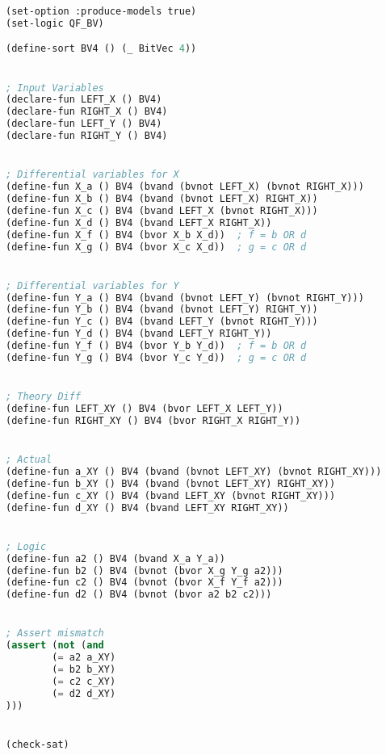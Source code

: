 \begin{lstlisting}[language=lisp, caption={OR logic proof}, label=lst:or-proof]
(set-option :produce-models true)
(set-logic QF_BV)

(define-sort BV4 () (_ BitVec 4))


; Input Variables
(declare-fun LEFT_X () BV4)
(declare-fun RIGHT_X () BV4)
(declare-fun LEFT_Y () BV4)
(declare-fun RIGHT_Y () BV4)


; Differential variables for X
(define-fun X_a () BV4 (bvand (bvnot LEFT_X) (bvnot RIGHT_X)))
(define-fun X_b () BV4 (bvand (bvnot LEFT_X) RIGHT_X))
(define-fun X_c () BV4 (bvand LEFT_X (bvnot RIGHT_X)))
(define-fun X_d () BV4 (bvand LEFT_X RIGHT_X))
(define-fun X_f () BV4 (bvor X_b X_d))  ; f = b OR d
(define-fun X_g () BV4 (bvor X_c X_d))  ; g = c OR d


; Differential variables for Y
(define-fun Y_a () BV4 (bvand (bvnot LEFT_Y) (bvnot RIGHT_Y)))
(define-fun Y_b () BV4 (bvand (bvnot LEFT_Y) RIGHT_Y))
(define-fun Y_c () BV4 (bvand LEFT_Y (bvnot RIGHT_Y)))
(define-fun Y_d () BV4 (bvand LEFT_Y RIGHT_Y))
(define-fun Y_f () BV4 (bvor Y_b Y_d))  ; f = b OR d
(define-fun Y_g () BV4 (bvor Y_c Y_d))  ; g = c OR d


; Theory Diff
(define-fun LEFT_XY () BV4 (bvor LEFT_X LEFT_Y))
(define-fun RIGHT_XY () BV4 (bvor RIGHT_X RIGHT_Y))


; Actual
(define-fun a_XY () BV4 (bvand (bvnot LEFT_XY) (bvnot RIGHT_XY)))
(define-fun b_XY () BV4 (bvand (bvnot LEFT_XY) RIGHT_XY))
(define-fun c_XY () BV4 (bvand LEFT_XY (bvnot RIGHT_XY)))
(define-fun d_XY () BV4 (bvand LEFT_XY RIGHT_XY))


; Logic
(define-fun a2 () BV4 (bvand X_a Y_a))
(define-fun b2 () BV4 (bvnot (bvor X_g Y_g a2)))
(define-fun c2 () BV4 (bvnot (bvor X_f Y_f a2)))
(define-fun d2 () BV4 (bvnot (bvor a2 b2 c2)))


; Assert mismatch
(assert (not (and
		(= a2 a_XY)
		(= b2 b_XY)
		(= c2 c_XY)
		(= d2 d_XY)
)))


(check-sat)
\end{lstlisting}

